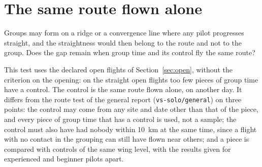 \section{The same route flown alone}\label{sec:route}

Groups may form on a ridge or a convergence line where any pilot progresses straight, and the
straightness would then belong to the route and not to the group. Does the gap remain when group
time and its control fly the same route?

This test uses the declared open flights of Section~\ref{sec:open}, without the criterion on the opening:
on the straight open flights too few pieces of group time have a control. The control is the same route
flown alone, on another day. It differs from the route test of the
general report (\texttt{vs-solo/\allowbreak general}) on three points: the control may come from any
site and date other than that of the piece, and every piece of group time that has a control is used,
not a sample; the control must also have had nobody within 10~km at the same time, since a flight with
no contact in the grouping can still have flown near others; and a piece is compared with controls of
the same wing level, with the results given for experienced and beginner pilots apart.





